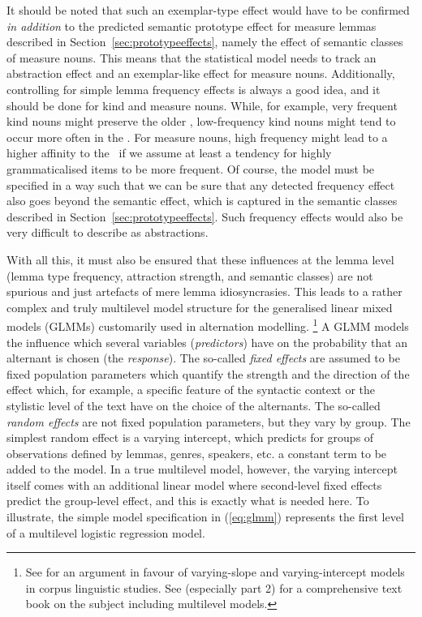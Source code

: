 It should be noted that such an exemplar-type effect would have to be confirmed \textit{in addition} to the predicted semantic prototype effect for measure lemmas described in Section~\ref{sec:prototypeeffects}, namely the effect of semantic classes of measure nouns.
This means that the statistical model needs to track an abstraction effect and an exemplar-like effect for measure nouns.
Additionally, controlling for simple lemma frequency effects is always a good idea, and it should be done for kind and measure nouns.
While, for example, very frequent kind nouns might preserve the older \PGCa, low-frequency kind nouns might tend to occur more often in the \NACa.
For measure nouns, high frequency might lead to a higher affinity to the \NACa\ if we assume at least a tendency for highly grammaticalised items to be more frequent.
Of course, the model must be specified in a way such that we can be sure that any detected frequency effect also goes beyond the semantic effect, which is captured in the semantic classes described in Section~\ref{sec:prototypeeffects}.
Such frequency effects would also be very difficult to describe as abstractions.

With all this, it must also be ensured that these influences at the lemma level (lemma type frequency, attraction strength, and semantic classes) are not spurious and just artefacts of mere lemma idiosyncrasies.
This leads to a rather complex and truly multilevel model structure for the generalised linear mixed models (GLMMs) customarily used in alternation modelling.%
\footnote{See \citet{Gries2015} for an argument in favour of varying-slope and varying-intercept models in corpus linguistic studies.
See \citet{GelmanHill2006} (especially part 2) for a comprehensive text book on the subject including multilevel models.}
A GLMM models the influence which several variables (\textit{predictors}) have on the probability that an alternant is chosen (the \textit{response}).
The so-called \textit{fixed effects} are assumed to be fixed population parameters which quantify the strength and the direction of the effect which, for example, a specific feature of the syntactic context or the stylistic level of the text have on the choice of the alternants.
The so-called \textit{random effects} are not fixed population parameters, but they vary by group.
The simplest random effect is a varying intercept, which predicts for groups of observations defined by lemmas, genres, speakers, etc. a constant term to be added to the model.
In a true multilevel model, however, the varying intercept itself comes with an additional linear model where second-level fixed effects predict the group-level effect, and this is exactly what is needed here.
To illustrate, the simple model specification in (\ref{eq:glmm}) represents the first level of a multilevel logistic regression model.

